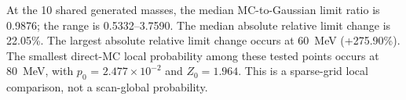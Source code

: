 At the 10 shared generated masses, the median MC-to-Gaussian limit ratio is 0.9876; the range is 0.5332--3.7590. The median absolute relative limit change is 22.05\%. The largest absolute relative limit change occurs at 60~MeV (+275.90\%). The smallest direct-MC local probability among these tested points occurs at 80~MeV, with $p_0$ = $2.477\times10^{-2}$ and $Z_0=1.964$. This is a sparse-grid local comparison, not a scan-global probability.

